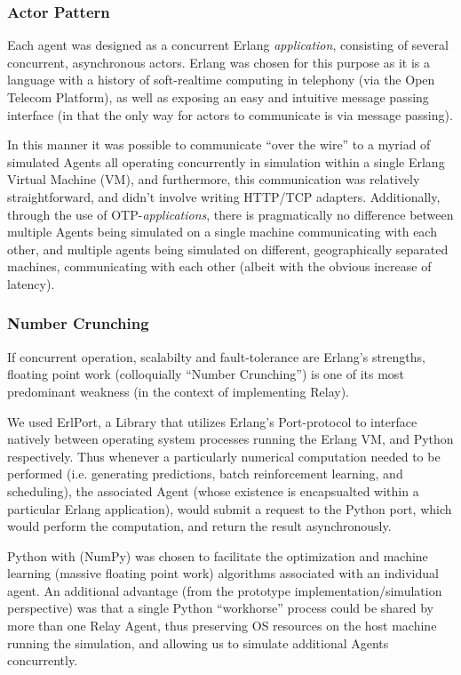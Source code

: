 \documentclass{report}
\begin{document}
\subsubsection{Actor Pattern}
Each agent was designed as a concurrent Erlang \emph{application}, consisting of several concurrent, asynchronous actors.
Erlang was chosen for this purpose as it is a language with a history of soft-realtime computing in telephony (via the Open Telecom Platform), as well as exposing an easy and intuitive message passing interface (in that the only way for actors to communicate is via message passing).

In this manner it was possible to communicate ``over the wire'' to a myriad of simulated Agents all operating concurrently in simulation within a single Erlang Virtual Machine (VM), and furthermore, this communication was relatively straightforward, and didn't involve writing HTTP/TCP adapters.
Additionally, through the use of OTP-\emph{applications}, there is pragmatically no difference between multiple Agents being simulated on a single machine communicating with each other, and multiple agents being simulated on different, geographically separated machines, communicating with each other (albeit with the obvious increase of latency).

\subsubsection{Number Crunching}
If concurrent operation, scalabilty and fault-tolerance are Erlang's strengths, floating point work (colloquially ``Number Crunching'') is one of its most predominant weakness (in the context of implementing Relay).

We used ErlPort, a Library that utilizes Erlang's Port-protocol to interface natively between operating system processes running the Erlang VM, and Python respectively.
Thus whenever a particularly numerical computation needed to be performed (i.e. generating predictions, batch reinforcement learning, and scheduling), the associated Agent (whose existence is encapsualted within a particular Erlang application), would submit a request to the Python port, which would perform the computation, and return the result asynchronously.

Python with (NumPy) was chosen to facilitate the optimization and machine learning (massive floating point work) algorithms associated with an individual agent.
An additional advantage (from the prototype implementation/simulation perspective) was that a single Python ``workhorse'' process could be shared by more than one Relay Agent, thus preserving OS resources on the host machine running the simulation, and allowing us to simulate additional Agents concurrently.
\end{document}
